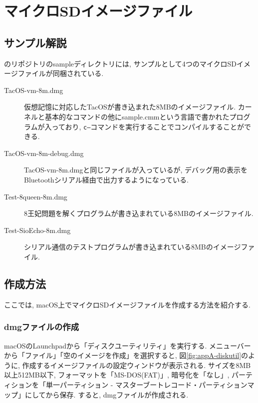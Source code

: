 \chapter{マイクロSDイメージファイル}
\label{appA}

\section{サンプル解説}
\tacsim のリポジトリのsampleディレクトリには, サンプルとして4つのマイクロSDイメージファイルが同梱されている. 

\begin{description}
    \item[TacOS-vm-8m.dmg] 仮想記憶に対応したTacOSが書き込まれた8MBのイメージファイル. カーネルと基本的なコマンドの他にsample.cmmという\cmm 言語で書かれたプログラムが入っており, {\tt c--}コマンドを実行することでコンパイルすることができる.
    \item[TacOS-vm-8m-debug.dmg] TacOS-vm-8m.dmgと同じファイルが入っているが, デバッグ用の表示をBluetoothシリアル経由で出力するようになっている.
    \item[Test-8queen-8m.dmg] 8王妃問題を解くプログラムが書き込まれている8MBのイメージファイル.
    \item[Test-SioEcho-8m.dmg] シリアル通信のテストプログラムが書き込まれている8MBのイメージファイル.
\end{description}

\section{作成方法}

ここでは, macOS上でマイクロSDイメージファイルを作成する方法を紹介する. 

\subsection{dmgファイルの作成}

macOSのLaunchpadから「ディスクユーティリティ」を実行する. メニューバーから「ファイル」\rightarrow「空のイメージを作成」を選択すると, 図\ref{fig:appA-diskutil}のように, 作成するイメージファイルの設定ウィンドウが表示される.
サイズを8MB以上512MB以下, フォーマットを「MS-DOS(FAT)」, 暗号化を「なし」, パーティションを「単一パーティション - マスターブートレコード・パーティションマップ」にしてから保存. すると, dmgファイルが作成される.

